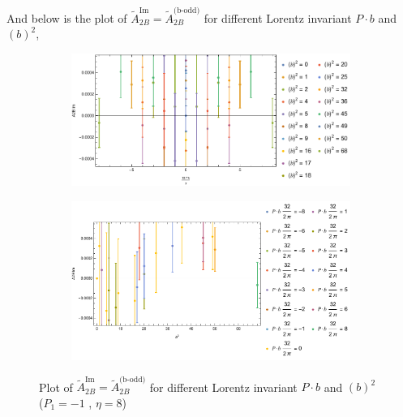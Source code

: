 \documentclass[]{article}
\numberwithin{equation}{section}
\newcommand{\tAmp}{\widetilde{A}}
\newcommand{\tAmp}{\ensuremath{\widetilde{A}^{(+)}}}
\begin{document}
\pagebreak

And below is the plot of $\tAmp^{\text{Im}}_{2B}=\tAmp^{\text{(b-odd)}}_{2B}$ for different Lorentz invariant $P\cdot b$ and $(b)^2$,
\begin{figure}[h!]
     \centering
     \begin{subfigure}[b]{0.45\textwidth}
         \centering
         \includegraphics[width=\textwidth]{bP_A2B_b_odd_P1_-1_eta_8a.pdf}
     \end{subfigure}
     \begin{subfigure}[b]{0.45\textwidth}
         \centering
         \includegraphics[width=\textwidth]{bsq_A2B_b_odd_P1_-1_eta_8a.pdf}
     \end{subfigure}
        \caption{Plot of $\tAmp^{\text{Im}}_{2B}=\tAmp^{\text{(b-odd)}}_{2B}$ for different Lorentz invariant $P\cdot b$ and $(b)^2$  ($P_{1} = -1$ , $\eta=8$)}
\end{figure}
\end{document}
